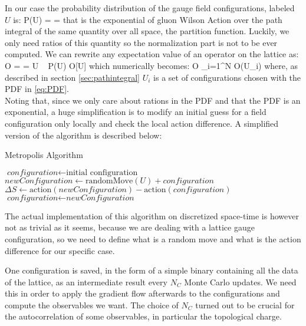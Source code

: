 In our case the probability distribution of the gauge field configurations, labeled $U$ is:
\beq
\label{eq:PDF}
    P(U) =  = 
\eeq
that is the exponential of gluon Wilson Action over the path integral of the same quantity over all space, the partition function. Luckily, we only need ratios of this quantity so the normalization part is not to be ever computed. We can rewrite any expectation value of an operator on the lattice as:
\beq
    \langle O \rangle =  = \int  \D U ~ P(U) O[U]
\eeq
which numerically becomes:
\beq
\langle O \rangle \approx {} \sum_{i=1}^N O(U_i)
\eeq
where, as described in section \cref{sec:pathintegral} $U_i$ is a set of configurations chosen with the PDF in \cref{eq:PDF}. \\
Noting that, since we only care about rations in the PDF and that the PDF is an exponential, a huge simplification is to modify an initial guess for a field configuration only locally and check the local action difference.
A simplified version of the algorithm is described below:
\begin{algorithm} 
    \caption{Metropolis Algorithm}\label{metropolis:algo}
    \begin{algorithmic}[1]
    \State $\textit{configuration} \gets \text{initial configuration}$
            \State $\textit{newConfiguration}  \gets \text{randomMove}(U) + \textit{configuration}$  
            \State $\Delta S \gets \text{action} (\textit{newConfiguration}) - \text{action} (\textit{configuration})$
                \State $\textit{configuration} \gets \textit{newConfiguration}$
            \EndIf
        \EndFor 
    \EndFor
    \end{algorithmic}  
\end{algorithm} 

The actual implementation of this algorithm on discretized space-time is however not as trivial as it seems, because we are dealing with a lattice gauge configuration, so we need to define what is a random move and what is the action difference for our specific case.
 
One configuration is saved, in the form of a simple binary containing all the data of the lattice, as an intermediate result every $N_C$ Monte Carlo updates. We need this in order to apply the gradient flow afterwards to the configurations and compute the observables we want. The choice of $N_C$ turned out to be crucial for the autocorrelation of some observables, in particular the topological charge.

